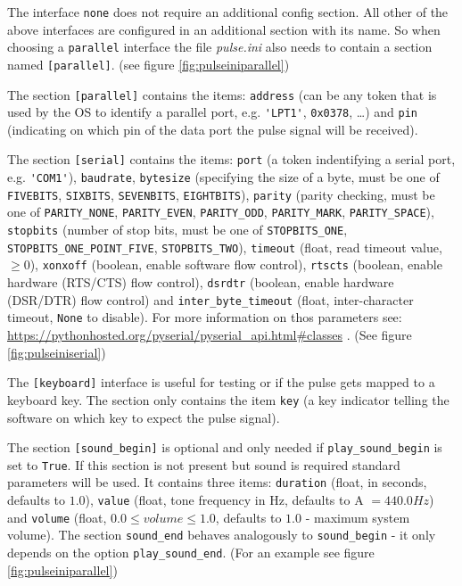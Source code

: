 \documentclass[12pt,a4paper]{book}
\begin{document}
The interface \verb|none| does not require an additional config section. All other of the above interfaces are configured in an additional section with its name. So when choosing a \verb|parallel| interface the file \textit{pulse.ini} also needs to contain a section named \verb|[parallel]|. (see figure \ref{fig:pulseiniparallel})

The section \verb|[parallel]| contains the items: \verb|address| (can be any token that is used by the OS to identify a parallel port, e.g. \verb|'LPT1'|, \verb|0x0378|, \dots) and \verb|pin| (indicating on which pin of the data port the pulse signal will be received).

The section \verb|[serial]| contains the items: \verb|port| (a token indentifying a serial port, e.g. \verb|'COM1'|), \verb|baudrate|, \verb|bytesize| (specifying the size of a byte, must be one of \verb|FIVEBITS|, \verb|SIXBITS|, \verb|SEVENBITS|, \verb|EIGHTBITS|), \verb|parity| (parity checking, must be one of \verb|PARITY_NONE|, \verb|PARITY_EVEN|, \verb|PARITY_ODD|, \verb|PARITY_MARK|, \verb|PARITY_SPACE|), \verb|stopbits| (number of stop bits, must be one of \verb|STOPBITS_ONE|, \verb|STOPBITS_ONE_POINT_FIVE|, \verb|STOPBITS_TWO|), \verb|timeout| (float, read timeout value, $\ge 0$), \verb|xonxoff| (boolean, enable software flow control), \verb|rtscts| (boolean, enable hardware (RTS/CTS) flow control), \verb|dsrdtr| (boolean, enable hardware (DSR/DTR) flow control) and \verb|inter_byte_timeout| (float, inter-character timeout, \verb|None| to disable). For more information on thos parameters see: \url{https://pythonhosted.org/pyserial/pyserial_api.html#classes} . (See figure \ref{fig:pulseiniserial})

The \verb|[keyboard]| interface is useful for testing or if the pulse gets mapped to a keyboard key. The section only contains the item \verb|key| (a key indicator telling the software on which key to expect the pulse signal).

The section \verb|[sound_begin]| is optional and only needed if \verb|play_sound_begin| is set to \verb|True|. If this section is not present but sound is required standard parameters will be used. It contains three items: \verb|duration| (float, in seconds, defaults to $1.0$), \verb|value| (float, tone frequency in Hz, defaults to A $= 440.0 Hz$) and \verb|volume| (float, $0.0 \le volume \le 1.0$, defaults to $1.0$ - maximum system volume). The section \verb|sound_end| behaves analogously to \verb|sound_begin| - it only depends on the option \verb|play_sound_end|. (For an example see figure \ref{fig:pulseiniparallel})
\end{document}
